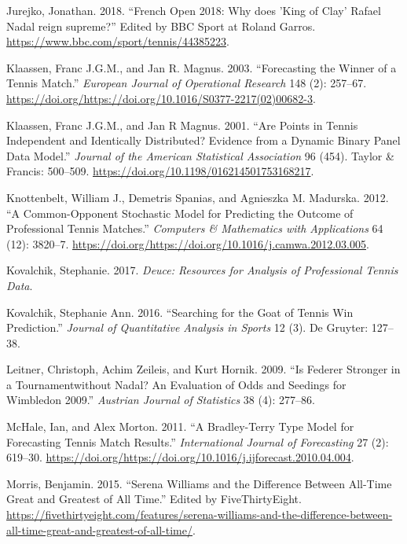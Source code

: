 \documentclass[]{article}
\begin{document}
\leavevmode\hypertarget{ref-bbc2018}{}%
Jurejko, Jonathan. 2018. ``French Open 2018: Why does 'King of Clay'
Rafael Nadal reign supreme?'' Edited by BBC Sport at Roland Garros.
\url{https://www.bbc.com/sport/tennis/44385223}.

\leavevmode\hypertarget{ref-klaassen2003}{}%
Klaassen, Franc J.G.M., and Jan R. Magnus. 2003. ``Forecasting the
Winner of a Tennis Match.'' \emph{European Journal of Operational
Research} 148 (2): 257--67.
\url{https://doi.org/https://doi.org/10.1016/S0377-2217(02)00682-3}.

\leavevmode\hypertarget{ref-klaassen2001}{}%
Klaassen, Franc J.G.M., and Jan R Magnus. 2001. ``Are Points in Tennis
Independent and Identically Distributed? Evidence from a Dynamic Binary
Panel Data Model.'' \emph{Journal of the American Statistical
Association} 96 (454). Taylor \& Francis: 500--509.
\url{https://doi.org/10.1198/016214501753168217}.

\leavevmode\hypertarget{ref-knottenbelt2012}{}%
Knottenbelt, William J., Demetris Spanias, and Agnieszka M. Madurska.
2012. ``A Common-Opponent Stochastic Model for Predicting the Outcome of
Professional Tennis Matches.'' \emph{Computers \& Mathematics with
Applications} 64 (12): 3820--7.
\url{https://doi.org/https://doi.org/10.1016/j.camwa.2012.03.005}.

\leavevmode\hypertarget{ref-deuce2017}{}%
Kovalchik, Stephanie. 2017. \emph{Deuce: Resources for Analysis of
Professional Tennis Data}.

\leavevmode\hypertarget{ref-kovalchik2016}{}%
Kovalchik, Stephanie Ann. 2016. ``Searching for the Goat of Tennis Win
Prediction.'' \emph{Journal of Quantitative Analysis in Sports} 12 (3).
De Gruyter: 127--38.

\leavevmode\hypertarget{ref-leitner2009}{}%
Leitner, Christoph, Achim Zeileis, and Kurt Hornik. 2009. ``Is Federer
Stronger in a Tournamentwithout Nadal? An Evaluation of Odds and
Seedings for Wimbledon 2009.'' \emph{Austrian Journal of Statistics} 38
(4): 277--86.

\leavevmode\hypertarget{ref-mchale2011}{}%
McHale, Ian, and Alex Morton. 2011. ``A Bradley-Terry Type Model for
Forecasting Tennis Match Results.'' \emph{International Journal of
Forecasting} 27 (2): 619--30.
\url{https://doi.org/https://doi.org/10.1016/j.ijforecast.2010.04.004}.

\leavevmode\hypertarget{ref-five2015}{}%
Morris, Benjamin. 2015. ``Serena Williams and the Difference Between
All-Time Great and Greatest of All Time.'' Edited by FiveThirtyEight.
\url{https://fivethirtyeight.com/features/serena-williams-and-the-difference-between-all-time-great-and-greatest-of-all-time/}.
\end{document}
